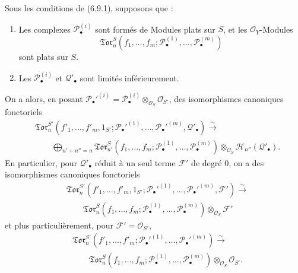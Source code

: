 \begin{corollary}[6.9.6]
Sous les conditions de (6.9.1), supposons que :
\begin{enumerate}
  \item[$1^\circ$] Les complexes $\mathscr P_\bullet^{(i)}$ sont formés de
  Modules plats sur $S$, et les $\mathscr O_Y$-Modules
  \[
    \mathfrak{Tor}_n^S
    (f_1,\ldots,f_m;
     \mathscr P_\bullet^{(1)},\ldots,\mathscr P_\bullet^{(m)})
  \]
  sont plats sur $S$.
  \item[$2^\circ$] Les $\mathscr P_\bullet^{(i)}$ et
  $\mathscr Q'_\bullet$ sont limités inférieurement.
\end{enumerate}

On a alors, en posant
$\mathscr P_\bullet'^{(i)}=
\mathscr P_\bullet^{(i)}\otimes_{\mathscr O_S}\mathscr O_{S'}$, des
isomorphismes canoniques fonctoriels
\[
\begin{split}
  &\mathfrak{Tor}_n^{S'}
  (f'_1,\ldots,f'_m,1_{S'};
   \mathscr P_\bullet'^{(1)},\ldots,
   \mathscr P_\bullet'^{(m)},\mathscr Q'_\bullet)
  \xrightarrow{\sim}\\
  &\qquad
  \bigoplus_{n'+n''=n}
  \mathfrak{Tor}_{n'}^S
  (f_1,\ldots,f_m;
   \mathscr P_\bullet^{(1)},\ldots,
   \mathscr P_\bullet^{(m)})
  \otimes_{\mathscr O_S}\mathscr H_{n''}(\mathscr Q'_\bullet).
\end{split}
\tag{6.9.6.1}\label{III.6.9.6.1.fr}
\]
En particulier, pour $\mathscr Q'_\bullet$ réduit à un seul terme
$\mathscr F'$ de degré $0$, on a des isomorphismes canoniques fonctoriels
\[
\begin{split}
  &\mathfrak{Tor}_n^{S'}
  (f'_1,\ldots,f'_m,1_{S'};
   \mathscr P_\bullet'^{(1)},\ldots,
   \mathscr P_\bullet'^{(m)},\mathscr F')
  \xrightarrow{\sim}\\
  &\qquad
  \mathfrak{Tor}_n^S
  (f_1,\ldots,f_m;
   \mathscr P_\bullet^{(1)},\ldots,
   \mathscr P_\bullet^{(m)})
  \otimes_{\mathscr O_S}\mathscr F'
\end{split}
\tag{6.9.6.2}\label{III.6.9.6.2.fr}
\]
et plus particulièrement, pour $\mathscr F'=\mathscr O_{S'}$,
\[
\begin{split}
  &\mathfrak{Tor}_n^{S'}
  (f'_1,\ldots,f'_m;
   \mathscr P_\bullet'^{(1)},\ldots,
   \mathscr P_\bullet'^{(m)})
  \xrightarrow{\sim}\\
  &\qquad
  \mathfrak{Tor}_n^S
  (f_1,\ldots,f_m;
   \mathscr P_\bullet^{(1)},\ldots,
   \mathscr P_\bullet^{(m)})
  \otimes_{\mathscr O_S}\mathscr O_{S'}.
\end{split}
\tag{6.9.6.3}\label{III.6.9.6.3.fr}
\]
\end{corollary}


